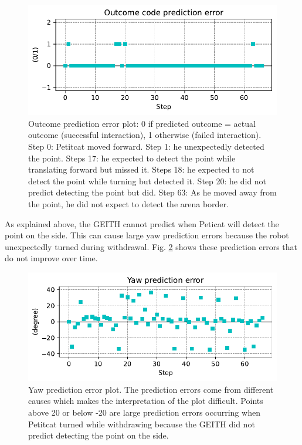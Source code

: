 \documentclass[runningheads]{llncs}
\begin{document}
\begin{figure}
	\includegraphics[width=\textwidth]{01_Outcome_code.pdf}
	\caption{Outcome prediction error plot: 0 if predicted outcome = actual outcome (successful interaction), 1 otherwise (failed interaction).
	Step 0: Petitcat moved forward.
	Step 1: he unexpectedly detected the point.
	Steps 17: he expected to detect the point while translating forward but missed it.
	Steps 18: he expected to not detect the point while turning but detected it.
	Step 20: he did not predict detecting the point but did. 
	Step 63: As he moved away from the point, he did not expect to detect the arena border. } \label{fig:outcome}
\end{figure}

As explained above, the GEITH cannot predict when Peticat will detect the point on the side. 
This can cause large yaw prediction errors because the robot unexpectedly turned during withdrawal.
Fig. \ref{fig:yaw_pe} shows these prediction errors that do not improve over time. 

\begin{figure}
	\includegraphics[width=\textwidth]{02_yaw_pe.pdf}
	\caption{Yaw prediction error plot. The prediction errors come from different causes which makes the interpretation of the plot difficult. 
		Points above 20 or below -20 are large prediction errors occurring when Petitcat turned while withdrawing because the GEITH did not predict detecting the point on the side.
	} \label{fig:yaw_pe}
\end{figure}
\end{document}
